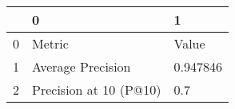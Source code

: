\begin{tabular}{lll}
\toprule
{} &                       0 &         1 \\
\midrule
0 &                  Metric &     Value \\
1 &       Average Precision &  0.947846 \\
2 &  Precision at 10 (P@10) &       0.7 \\
\bottomrule
\end{tabular}
